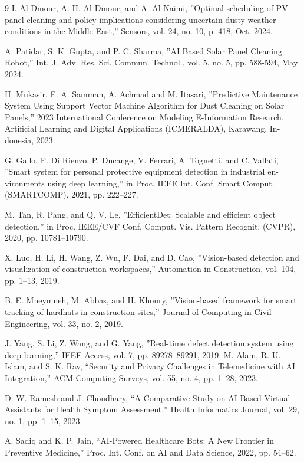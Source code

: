 \documentclass[10pt]{report}
\begin{document}
\begin{sloppypar}
{{{\begin{sloppypar}
\begin{thebibliography}{9}
 I. Al-Dmour, A. H. Al-Dmour, and A. Al-Naimi, ”Optimal scheduling of PV
panel cleaning and policy implications considering uncertain dusty weather
conditions in the Middle East,” Sensors, vol. 24, no. 10, p. 418, Oct. 2024.

 A. Patidar, S. K. Gupta, and P. C. Sharma, ”AI Based Solar Panel Cleaning
Robot,” Int. J. Adv. Res. Sci. Commun. Technol., vol. 5, no. 5, pp. 588-594,
May 2024.

 H. Mukasir, F. A. Samman, A. Achmad and M. Itasari, ”Predictive Maintenance
System Using Support Vector Machine Algorithm for Dust Cleaning on Solar
Panels,” 2023 International Conference on Modeling E-Information Research,
Artificial Learning and Digital Applications (ICMERALDA), Karawang, In-
donesia, 2023.

 G. Gallo, F. Di Rienzo, P. Ducange, V. Ferrari, A. Tognetti, and C. Vallati,
”Smart system for personal protective equipment detection in industrial en-
vironments using deep learning,” in Proc. IEEE Int. Conf. Smart Comput.
(SMARTCOMP), 2021, pp. 222–227.

 M. Tan, R. Pang, and Q. V. Le, ”EfficientDet: Scalable and efficient object
detection,” in Proc. IEEE/CVF Conf. Comput. Vis. Pattern Recognit. (CVPR),
2020, pp. 10781–10790.

 X. Luo, H. Li, H. Wang, Z. Wu, F. Dai, and D. Cao, ”Vision-based detection
and visualization of construction workspaces,” Automation in Construction, vol.
104, pp. 1–13, 2019.

 B. E. Mneymneh, M. Abbas, and H. Khoury, ”Vision-based framework for
smart tracking of hardhats in construction sites,” Journal of Computing in Civil
Engineering, vol. 33, no. 2, 2019.

 J. Yang, S. Li, Z. Wang, and G. Yang, ”Real-time defect detection system using
deep learning,” IEEE Access, vol. 7, pp. 89278–89291, 2019.
 M. Alam, R. U. Islam, and S. K. Ray, ``Security and Privacy Challenges in Telemedicine with AI Integration,'' ACM Computing Surveys, vol. 55, no. 4, pp. 1--28, 2023.

 D. W. Ramesh and J. Choudhary, ``A Comparative Study on AI-Based Virtual Assistants for Health Symptom Assessment,'' Health Informatics Journal, vol. 29, no. 1, pp. 1--15, 2023.

 A. Sadiq and K. P. Jain, ``AI-Powered Healthcare Bots: A New Frontier in Preventive Medicine,'' Proc. Int. Conf. on AI and Data Science, 2022, pp. 54--62. 


\end{thebibliography}
\end{sloppypar}}}}
\end{sloppypar}
\end{document}
